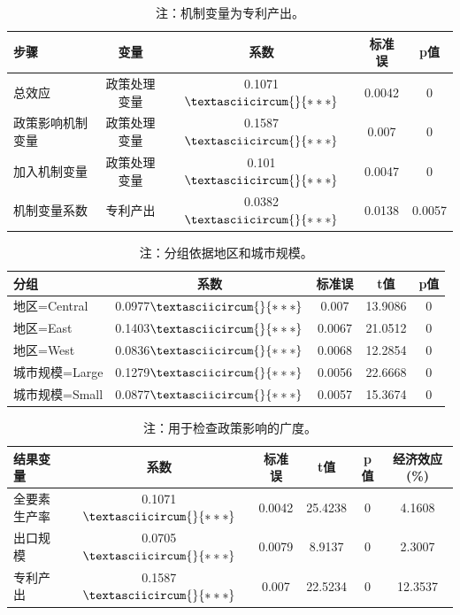 \documentclass[12pt,a4paper]{article}
\begin{document}
\begin{table}[!htbp]
\centering
\caption{创新机制检验}
\setlength{\tabcolsep}{4pt}
\begin{tabular*}{\textwidth}{@{\extracolsep{\fill}}lcccc}
\toprule
步骤 & 变量 & 系数 & 标准误 & p值 \\
\midrule
总效应 & 政策处理变量 & 0.1071$\textasciicircum{}{***}$ & 0.0042 & 0 \\
政策影响机制变量 & 政策处理变量 & 0.1587$\textasciicircum{}{***}$ & 0.007 & 0 \\
加入机制变量 & 政策处理变量 & 0.101$\textasciicircum{}{***}$ & 0.0047 & 0 \\
机制变量系数 & 专利产出 & 0.0382$\textasciicircum{}{***}$ & 0.0138 & 0.0057 \\
\bottomrule
\end{tabular*}
\caption*{\footnotesize 注：机制变量为专利产出。}
\end{table}

\begin{table}[!htbp]
\centering
\caption{异质性分析}
\setlength{\tabcolsep}{4pt}
\begin{tabular*}{\textwidth}{@{\extracolsep{\fill}}lcccc}
\toprule
分组 & 系数 & 标准误 & t值 & p值 \\
\midrule
地区=Central & 0.0977$\textasciicircum{}{***}$ & 0.007 & 13.9086 & 0 \\
地区=East & 0.1403$\textasciicircum{}{***}$ & 0.0067 & 21.0512 & 0 \\
地区=West & 0.0836$\textasciicircum{}{***}$ & 0.0068 & 12.2854 & 0 \\
城市规模=Large & 0.1279$\textasciicircum{}{***}$ & 0.0056 & 22.6668 & 0 \\
城市规模=Small & 0.0877$\textasciicircum{}{***}$ & 0.0057 & 15.3674 & 0 \\
\bottomrule
\end{tabular*}
\caption*{\footnotesize 注：分组依据地区和城市规模。}
\end{table}

\begin{table}[!htbp]
\centering
\caption{替代结果变量检验}
\setlength{\tabcolsep}{4pt}
\begin{tabular*}{\textwidth}{@{\extracolsep{\fill}}lccccc}
\toprule
结果变量 & 系数 & 标准误 & t值 & p值 & 经济效应(\%) \\
\midrule
全要素生产率 & 0.1071$\textasciicircum{}{***}$ & 0.0042 & 25.4238 & 0 & 4.1608 \\
出口规模 & 0.0705$\textasciicircum{}{***}$ & 0.0079 & 8.9137 & 0 & 2.3007 \\
专利产出 & 0.1587$\textasciicircum{}{***}$ & 0.007 & 22.5234 & 0 & 12.3537 \\
\bottomrule
\end{tabular*}
\caption*{\footnotesize 注：用于检查政策影响的广度。}
\end{table}
\end{document}
